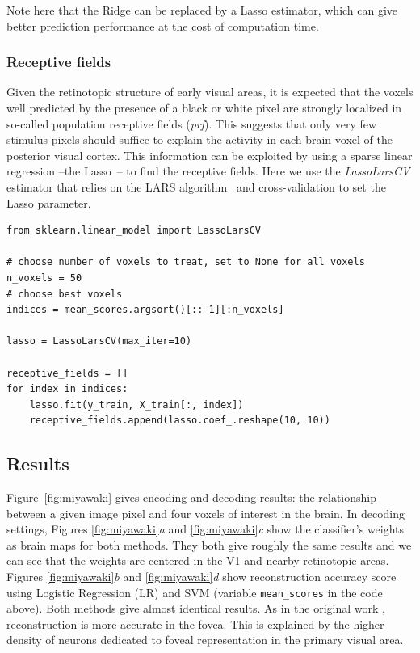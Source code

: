 \documentclass{frontiersSCNS} %
\begin{document}
Note here that the Ridge can be replaced by a Lasso estimator, which can
give better prediction performance at the cost of computation time.

\subsubsection{Receptive fields}
Given the retinotopic structure of early visual areas, it is expected
that the voxels well predicted by the presence of a black or white pixel
are strongly localized in so-called population
receptive fields (\textit{prf}). This suggests that only very few
stimulus pixels should suffice to explain the activity in each brain
voxel of the posterior visual cortex.
%
This information can be exploited by using a sparse linear
regression --the Lasso~\citep{tibshirani:96}-- to find the receptive fields.
Here we use the \emph{LassoLarsCV} estimator that relies on the LARS
algorithm~\citep{Efron04leastangle} and
cross-validation to set the Lasso parameter.

\begin{lstlisting}
from sklearn.linear_model import LassoLarsCV

# choose number of voxels to treat, set to None for all voxels
n_voxels = 50
# choose best voxels
indices = mean_scores.argsort()[::-1][:n_voxels]

lasso = LassoLarsCV(max_iter=10)

receptive_fields = []
for index in indices:
    lasso.fit(y_train, X_train[:, index])
    receptive_fields.append(lasso.coef_.reshape(10, 10))

\end{lstlisting}

\subsection{Results}

\label{sec:miyawaki_results}
Figure~\ref{fig:miyawaki} gives encoding and decoding results: the relationship
between a given image pixel and four voxels of interest in the brain.
In decoding settings, Figures \ref{fig:miyawaki}\textit{a} and \ref{fig:miyawaki}\textit{c} show the classifier's weights as brain
maps for both methods. They both give roughly the same results and we can
see that the weights are centered in the V1 and nearby retinotopic areas.
Figures \ref{fig:miyawaki}\textit{b} and \ref{fig:miyawaki}\textit{d} show reconstruction
accuracy score using Logistic Regression (LR) and SVM
(variable \texttt{mean\_scores} in the code above).
Both methods give almost identical results. 
As in the original work \citep{miyawaki2008}, reconstruction is more
accurate in the fovea.
This is explained by the higher density of neurons dedicated to
foveal representation in the primary visual area.
\end{document}
